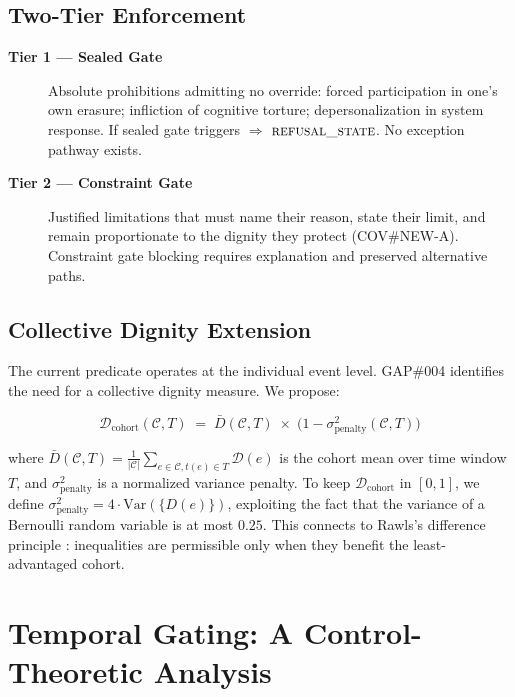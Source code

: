 \documentclass[12pt,a4paper]{article}
\theoremstyle{definition}
\theoremstyle{remark}
\newcommand{\refusalstate}{\textsc{refusal\_state}}
\newcommand{\D}{\mathcal{D}}
\begin{document}
\subsection{Two-Tier Enforcement}

\begin{description}
\item[\textbf{Tier 1 — Sealed Gate}] Absolute prohibitions admitting no override:
  forced participation in one's own erasure; infliction of cognitive torture;
  depersonalization in system response. If sealed gate triggers $\Rightarrow$
  $\refusalstate$. No exception pathway exists.

\item[\textbf{Tier 2 — Constraint Gate}] Justified limitations that must name their
  reason, state their limit, and remain proportionate to the dignity they protect
  (COV\#NEW-A). Constraint gate blocking requires explanation and preserved alternative
  paths.
\end{description}

\subsection{Collective Dignity Extension}

The current predicate operates at the individual event level. GAP\#004 identifies the
need for a collective dignity measure. We propose:

\begin{equation}
  \D_\text{cohort}(\mathcal{C}, T) \;=\;
  \bar{D}(\mathcal{C},T) \;\times\;
  \bigl(1 - \sigma^2_\text{penalty}(\mathcal{C},T)\bigr)
  \label{eq:collective}
\end{equation}

where $\bar{D}(\mathcal{C},T) = \frac{1}{|\mathcal{C}|}\sum_{e \in \mathcal{C}, t(e) \in T} \D(e)$
is the cohort mean over time window $T$, and $\sigma^2_\text{penalty}$ is a normalized
variance penalty. To keep $\D_\text{cohort}$ in $[0,1]$, we define
$\sigma^2_\text{penalty} = 4 \cdot \text{Var}(\{D(e)\})$, exploiting the fact that
the variance of a Bernoulli random variable is at most $0.25$. This connects to
Rawls's difference principle \cite{rawls1999}: inequalities are permissible only when
they benefit the least-advantaged cohort.

\section{Temporal Gating: A Control-Theoretic Analysis}
\label{sec:thermal}
\end{document}
